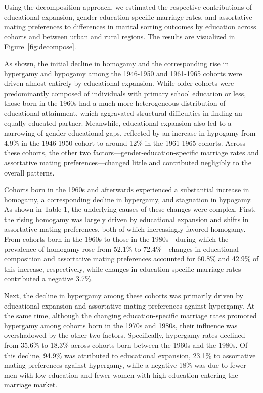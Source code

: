 Using the decomposition approach, we estimated the respective contributions of educational expansion, gender-education-specific marriage rates, and assortative mating preferences to differences in marital sorting outcomes by education across cohorts and between urban and rural regions. The results are visualized in Figure~\ref{fig:decompose}.

As shown, the initial decline in homogamy and the corresponding rise in hypergamy and hypogamy among the 1946-1950 and 1961-1965 cohorts were driven almost entirely by educational expansion. While older cohorts were predominantly composed of individuals with primary school education or less, those born in the 1960s had a much more heterogeneous distribution of educational attainment, which aggravated structural difficulties in finding an equally educated partner. Meanwhile, educational expansion also led to a narrowing of gender educational gaps, reflected by an increase in hypogamy from 4.9\% in the 1946-1950 cohort to around 12\% in the 1961-1965 cohorts. Across these cohorts, the other two factors—gender-education-specific marriage rates and assortative mating preferences—changed little and contributed negligibly to the overall patterns.

Cohorts born in the 1960s and afterwards experienced a substantial increase in homogamy, a corresponding decline in hypergamy, and stagnation in hypogamy. As shown in Table 1, the underlying causes of these changes were complex. First, the rising homogamy was largely driven by educational expansion and shifts in assortative mating preferences, both of which increasingly favored homogamy. From cohorts born in the 1960s to those in the 1980s—during which the prevalence of homogamy rose from 52.1\% to 72.4\%—changes in educational composition and assortative mating preferences accounted for 60.8\% and 42.9\% of this increase, respectively, while changes in education-specific marriage rates contributed a negative 3.7\%.

Next, the decline in hypergamy among these cohorts was primarily driven by educational expansion and assortative mating preferences against hypergamy. At the same time, although the changing education-specific marriage rates promoted hypergamy among cohorts born in the 1970s and 1980s, their influence was overshadowed by the other two factors. Specifically, hypergamy rates declined from 35.6\% to 18.3\% across cohorts born between the 1960s and the 1980s. Of this decline, 94.9\% was attributed to educational expansion, 23.1\% to assortative mating preferences against hypergamy, while a negative 18\% was due to fewer men with low education and fewer women with high education entering the marriage market.


